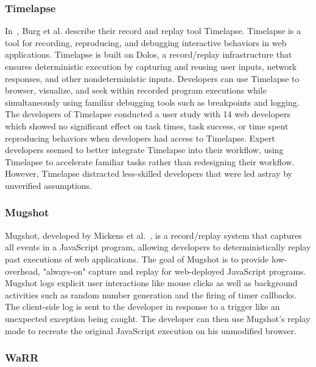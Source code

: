\subsubsection{Timelapse}

In~\cite{timelapse2013}, Burg et al. describe their record and replay tool Timelapse. Timelapse is a tool for recording, reproducing, and debugging interactive behaviors in web applications. Timelapse is built on Dolos, a record/replay infrastructure that ensures deterministic execution by capturing and reusing user inputs, network responses, and other nondeterministic inputs. Developers can use Timelapse to browser, visualize, and seek within recorded program executions while simultaneously using familiar debugging tools such as breakpoints and logging. The developers of Timelapse conducted a user study with 14 web developers which showed no significant effect on task times, task success, or time spent reproducing behaviors when developers had access to Timelapse. Expert developers seemed to better integrate Timelapse into their workflow, using Timelapse to accelerate familiar tasks rather than redesigning their workflow. However, Timelapse distracted less-skilled developers that were led astray by unverified assumptions.

\subsubsection{Mugshot}

Mugshot, developed by Mickens et al.~\cite{mugshot2010}, is a record/replay system that captures all events in a JavaScript program, allowing developers to deterministically replay past executions of web applications. The goal of Mugshot is to provide low-overhead, "always-on" capture and replay for web-deployed JavaScript programs. Mugshot logs explicit user interactions like mouse clicks as well as background activities such as random number generation and the firing of timer callbacks. The client-side log is sent to the developer in response to a trigger like an unexpected exception being caught. The developer can then use Mugshot's replay mode to recreate the original JavaScript execution on his unmodified browser. 

\subsubsection{WaRR}

